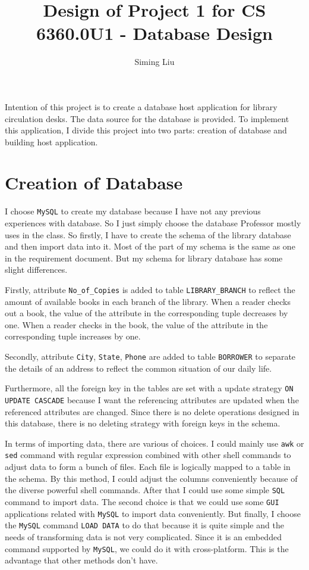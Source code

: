 \documentclass[a4paper, 12pt]{report}
\begin{document}
\title{Design of Project 1 for CS 6360.0U1 - Database Design}

\author{Siming Liu}

\maketitle{}

Intention of this project is to create a database host application for library circulation desks. The data source for the database is provided. To implement this application, I divide this project into two parts: creation of database and building host application.

\section*{Creation of Database}
I choose \lstinline{MySQL} to create my database because I have not any previous experiences with database. So I just simply choose the database Professor mostly uses in the class. So firstly, I have to create the schema of the library database and then import data into it. Most of the part of my schema is the same as one in the requirement document. But my schema for library database has some slight differences.

Firstly, attribute \lstinline{No_of_Copies} is added to table \lstinline{LIBRARY_BRANCH} to reflect the amount of available books in each branch of the library. When a reader checks out a book, the value of the attribute in the corresponding tuple decreases by one. When a reader checks in the book, the value of the attribute in the corresponding tuple increases by one.

Secondly, attribute \lstinline{City}, \lstinline{State}, \lstinline{Phone} are added to table \lstinline{BORROWER} to separate the details of an address to reflect the common situation of our daily life.

Furthermore, all the foreign key in the tables are set with a update strategy \lstinline{ON UPDATE CASCADE} because I want the referencing attributes are updated when the referenced attributes are changed. Since there is no delete operations designed in this database, there is no deleting strategy with foreign keys in the schema.

In terms of importing data, there are various of choices. I could mainly use \lstinline{awk} or \lstinline{sed} command with regular expression combined with other shell commands to adjust data to form a bunch of files. Each file is logically mapped to a table in the schema. By this method, I could adjust the columns conveniently because of the diverse powerful shell commands. After that I could use some simple \lstinline{SQL} command to import data. The second choice is that we could use some \lstinline{GUI} applications related with \lstinline{MySQL} to import data conveniently. But finally, I choose the \lstinline{MySQL} command \lstinline{LOAD DATA} to do that because it is quite simple and the needs of transforming data is not very complicated. Since it is an embedded command supported by \lstinline{MySQL}, we could do it with cross-platform. This is the advantage that other methods don't have.
\end{document}

